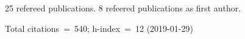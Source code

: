 25 refereed publications. 8 refeered publications as first author.

Total citations~=~540; h-index~=~12 (2019-01-29)
